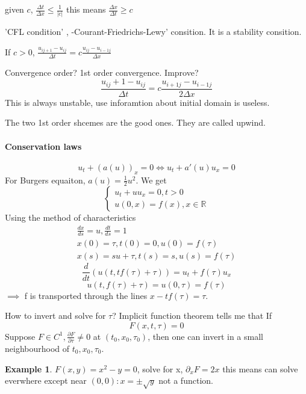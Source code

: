 \documentclass[a4paper]{article}
\theoremstyle{definition}
\newtheorem{example}{Example}[section]
\begin{document}
given $c$, $\frac{\Delta t}{\Delta x}\le \frac{1}{\left|c \right| }$ this means $\frac{\Delta x}{\Delta t }\ge c$

'CFL condition' , -Courant-Friedrichs-Lewy' consition. It is a stability consition. 

If $c>0$, $\frac{u_{ij+1}-u_{ij}}{\Delta t}=c \frac{u_{ij}-u_{i-1 j}}{\Delta x}$

Convergence order? 1st order convergence. Improve? 
\begin{equation}
	\frac{u_{ij}+1-u_{ij}}{\Delta t }=c \frac{u_{i+1j}-u_{i-1j}}{2\Delta x}
\end{equation} 
This is always unstable, use inforamtion about initial domain is useless. 

The two 1st order shcemes are the good ones. They are called upwind. 

\paragraph{Conservation laws}
\begin{equation}
	u_{t}+\left( a\left( u \right)  \right) _{x}=0 \iff u_t+a'\left( u \right) u_x=0
\end{equation} 
For Burgers equaiton, $a\left( u \right) =\frac{1}{2}u^2$. We get 
\begin{equation}
	\begin{cases}
		u_t+uu_x=0, t>0\\
		u\left( 0,x \right) =f\left( x \right) ,x\in \mathbb{R}
	\end{cases}
\end{equation} 
Using the method of characteristics
\begin{gather*}
	\frac{dx}{ds}=u, \frac{dt}{ds}=1\\
	x\left( 0 \right) =\tau , t\left( 0 \right) =0, u\left( 0 \right) =f\left( \tau \right) \\
x\left( s \right) =su+\tau, t(s)=s,u\left( s \right) =f\left( \tau \right) 
\end{gather*} 
\begin{equation}
	\frac{d}{dt}\left( u\left( t,tf\left( \tau \right) +\tau \right)  \right) =u_t+f\left( \tau \right) u_x
\end{equation} 
\begin{equation}
	u\left( t,f\left( \tau \right) +\tau \right) =u\left( 0,\tau \right) =f\left( \tau \right) 
\end{equation} 
$\implies$ f is transported through the lines $x-tf\left( \tau \right) =\tau$. 

How to invert and solve for $\tau$? Implicit function theorem tells me that If 
\begin{equation}
	F\left( x,t,\tau \right) =0
\end{equation} 
Suppose $F \in C^{1}, \frac{\partial F}{\partial \tau} \not = 0$ at $\left( t_0,x_0,\tau_0 \right) $, then one can invert in a small neighbourhood of $t_0,x_0,\tau_0$. 

\begin{example}
	$F\left( x,y \right) =x^2-y=0$, solve for x, $\partial _xF =2x$ this means can solve everwhere except near $\left( 0,0 \right) :x= \pm \sqrt{y}  $ not a function. 
\end{example}
\end{document}
